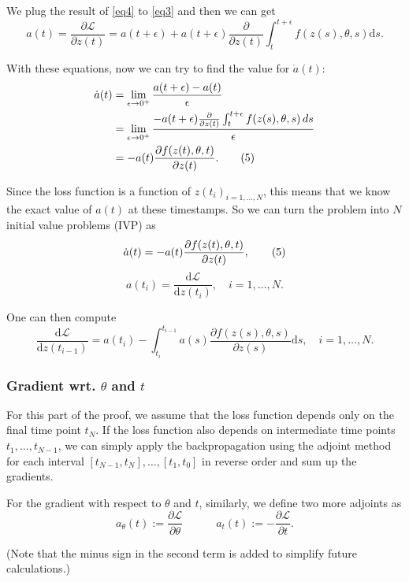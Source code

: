 \documentclass[a4paper,11pt,titlepage]{article}
\theoremstyle{definition}
\theoremstyle{plain}
\theoremstyle{remark}
\begin{document}
We plug the result of \ref{eq4} to \ref{eq3} and then we can get
$$
a(t)=\frac{\partial \mathcal{L}}{\partial z(t)} = a(t+\epsilon)+a(t+\epsilon)\frac{\partial}{\partial z(t)}\int_{t}^{t+\epsilon}f(z(s),\theta,s)\mathrm{d}s.
$$

With these equations, now we can try to find the value for $\dot{a}(t)$:
\begin{align}
\dot{a}(t) &= \lim_{\epsilon \to 0^{+}}\frac{a(t+\epsilon)-a(t)}{\epsilon}\notag\\
&=\lim_{\epsilon \to 0^{+}}\frac{-a(t+\epsilon)\frac{\partial}{\partial z(t)}\int_{t}^{t+\epsilon}f(z(s),\theta,s)\,ds}{\epsilon}\notag\\
&=-a(t)\frac{\partial f(z(t),\theta,t)}{\partial z(t)}.\tag{5}
\end{align}

Since the loss function is a function of $z(t_i)_{i=1,\dots,N}$, this means that we know the exact value of $a(t)$ at these timestamps. So we can turn the problem into $N$ initial value problems (IVP) as
\begin{equation}{\label{eq5}}
    \dot{a}(t) = -a(t)\frac{\partial f(z(t),\theta,t)}{\partial z(t)},\tag{5}
\end{equation}
$$ a(t_i) = \frac{\mathrm{d}\mathcal{L}}{\mathrm{d}z(t_i)},\quad i=1,\dots,N.
$$

One can then compute
$$
\frac{\mathrm{d}\mathcal{L}}{\mathrm{d}z(t_{i-1})} =a(t_i)- \int_{t_i}^{t_{i-1}}a(s)\frac{\partial f(z(s),\theta,s)}{\partial z(s)}\mathrm{d}s,\quad i=1,\dots,N.
$$

\subsubsection{Gradient wrt. $\theta$ and $t$}

For this part of the proof, we assume that the loss function depends only on the final time point $t_N$. If the loss function also depends on intermediate time points $t_1,\dots,t_{N-1}$, we can simply apply the backpropagation using the adjoint method for each interval $[t_{N-1},t_N],\dots,[t_1,t_0]$ in reverse order and sum up the gradients. 

For the gradient with respect to $\theta$ and $t$, similarly, we define two more adjoints as
$$a_{\theta}(t):=\frac{\partial\mathcal{L}}{\partial \theta}
\quad\quad\quad a_{t}(t):=-\frac{\partial\mathcal{L}}{\partial t}.$$

(Note that the minus sign in the second term is added to simplify future calculations.)
\end{document}
